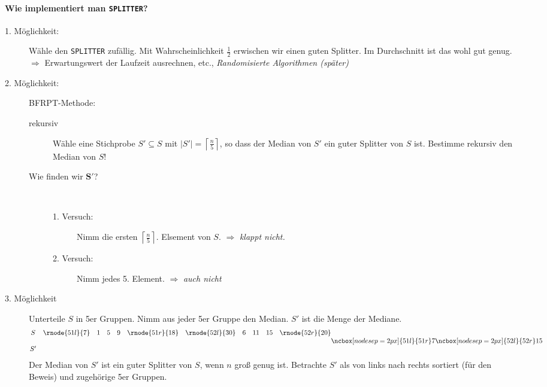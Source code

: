 \paragraph*{Wie implementiert man \texttt{SPLITTER}?}
\begin{description}
 \item[1. Möglichkeit:] Wähle den \texttt{SPLITTER} zufällig. Mit Wahrscheinlichkeit $\frac{1}{2}$ erwischen wir einen guten Splitter.
		Im Durchschnitt ist das wohl gut genug. \\
		$\Rightarrow$ Erwartungswert der Laufzeit ausrechnen, etc., \emph{Randomisierte Algorithmen (später)}
 \item[2. Möglichkeit:] BFRPT-Methode:
		\begin{description}
		\item[rekursiv] Wähle eine Stichprobe $S' \subseteq S$ mit $|S'| = \left\lceil\frac{n}{5}\right\rceil$, so dass der Median von $S'$ ein guter Splitter von $S$ ist. Bestimme rekursiv den Median von $S$!
		\item[Wie finden wir $\boldsymbol{S'}$?]\hspace{0cm}\\
			\begin{description}
			\item[1. Versuch:] Nimm die ersten $\left\lceil\frac{n}{5}\right\rceil$. Elsement von $S$. $\Rightarrow$ \emph{klappt nicht.}
			\item[2. Versuch:] Nimm jedes 5. Element. $\Rightarrow$ \emph{auch nicht}
			\end{description}
		\end{description}
 \item[3. Möglichkeit] Unterteile $S$ in 5er Gruppen. Nimm aus jeder 5er Gruppe den Median. $S'$ ist die Menge der Mediane.
		\Bsp
		\[
		\begin{matrix}
		 S & \rnode{51l}{7} & 1 & 5 & 9 & \rnode{51r}{18} \\&\\
		 S' 
		\end{matrix}\quad
		\begin{matrix}
		 \rnode{52l}{30} & 6 & 11 & 15 & \rnode{52r}{20} \\&\\
		 &
		\end{matrix}
		\ncbox[nodesep=2px]{51l}{51r}7
		\ncbox[nodesep=2px]{52l}{52r}15
		\]
		\Lemma Der Median von $S'$ ist ein guter Splitter von $S$, wenn $n$ groß genug ist.
		\Bew Betrachte $S'$ als von links nach rechts sortiert (für den Beweis) und zugehörige 5er Gruppen.
			

\end{description}
